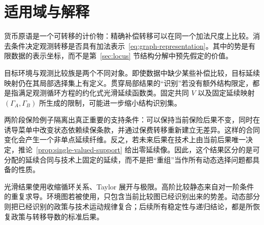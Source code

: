 \section{适用域与解释}

货币原语是一个可转移的计价物：精确补偿转移可以在同一个加法尺度上比较。消去条件决定观测转移是否具有加法表示~\eqref{eq:graph-representation}。其中的势是有限数据的表示坐标，而不是第~\ref{sec:locus} 节结构分解中预先假定的价值。

目标环境与观测比较族是两个不同对象。即使数据中缺少某些补偿比较，目标延续映射仍在其局部选择集上有定义。贯穿局部结果的“识别”若没有额外结构限定，都是指满足观测循环方程的约化式光滑延续函数类。固定共同 $V$ 以及固定延续映射 $(\Gamma_A,\Gamma_B)$ 所生成的限制，可能进一步缩小结构识别集。

两阶段保险例子隔离出真正重要的支持条件：可以保持当前保险后果不变，同时在诱导菜单中改变状态依赖续保条款，并通过保费转移重新建立无差异。这样的合同变化会产生一个非单点延续纤维。反之，若未来后果在技术上由当前后果唯一决定，推论~\ref{prop:single-valued-support} 给出零延续像。因此，这个结果区分的是可分配的延续合同与技术上固定的延续，而不是把“重组”当作所有动态选择问题都具备的性质。

光滑结果使用收缩循环关系、Taylor 展开与极限。高阶比较静态来自对一阶条件的重复求导。环境图若被使用，只包含当前比较图已经识别出来的势差。动态部分则把已经识别的政策与技术运动规律复合；后续所有稳定性与递归结论，都是所恢复政策与转移导数的标准后果。
